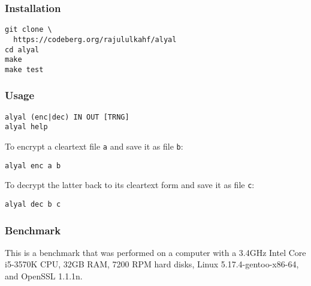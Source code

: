 \documentclass[twocolumn,hidelinks]{article}
\begin{document}
\subsubsection{Installation}
\begin{verbatim}
git clone \
  https://codeberg.org/rajululkahf/alyal
cd alyal
make
make test
\end{verbatim}

\subsubsection{Usage}

\begin{verbatim}
alyal (enc|dec) IN OUT [TRNG]
alyal help
\end{verbatim}

To encrypt a cleartext file \texttt{a} and save it as file \texttt{b}:
\begin{verbatim}
alyal enc a b
\end{verbatim}

To decrypt the latter back to its cleartext form and save it as file
\texttt{c}:
\begin{verbatim}
alyal dec b c
\end{verbatim}

\subsubsection{Benchmark}
This is a benchmark that was performed on a computer with a 3.4GHz Intel
Core i5-3570K CPU, 32GB RAM, 7200 RPM hard disks, Linux
5.17.4-gentoo-x86-64, and OpenSSL 1.1.1n.
\end{document}
